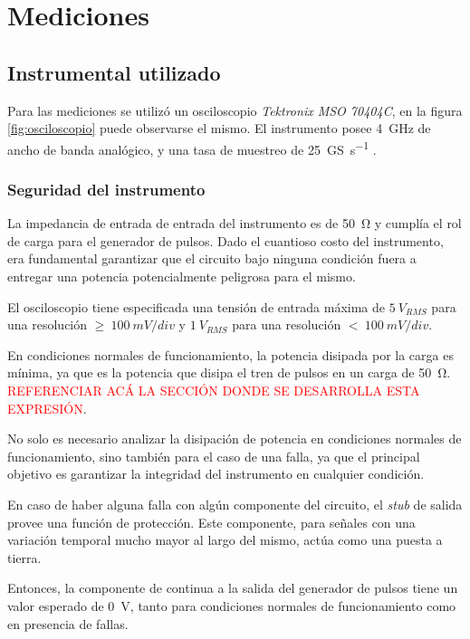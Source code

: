 \section{Mediciones}

\subsection{Instrumental utilizado}

Para las mediciones se utilizó un osciloscopio \textit{Tektronix MSO 70404C},
en la figura \ref{fig:osciloscopio} puede observarse el mismo. El instrumento 
posee \qty{4}{\giga\hertz} de ancho de banda analógico, y una tasa de muestreo
de \qty[per-mode=symbol]{25}{\giga\siemens\per\second} \cite{oscilloscope_datasheet}.

\subsubsection{Seguridad del instrumento}

La impedancia de entrada de entrada del instrumento es de \qty{50}{\ohm} y cumplía 
el rol de carga para el generador de pulsos. Dado el cuantioso costo del
instrumento, era fundamental garantizar que el circuito bajo ninguna condición
fuera a entregar una potencia potencialmente peligrosa para el mismo.

El osciloscopio tiene especificada una tensión de entrada máxima de $5 \ V_{RMS}$
para una resolución $\geq \ 100 \ mV/div$ y $1 \ V_{RMS}$ para una resolución
$< \ 100 \ mV/div$.

En condiciones normales de funcionamiento, la potencia disipada por la carga es
mínima, ya que es la potencia que disipa el tren de pulsos en un carga de
\qty{50}{\ohm}. \textcolor{red}{REFERENCIAR ACÁ LA SECCIÓN DONDE SE DESARROLLA
ESTA EXPRESIÓN}.

No solo es necesario analizar la disipación de potencia en condiciones normales
de funcionamiento, sino también para el caso de una falla, ya que el principal
objetivo es garantizar la integridad del instrumento en cualquier condición.

En caso de haber alguna falla con algún componente del circuito, el \textit{stub}
de salida provee una función de protección. Este componente, para señales con
una variación temporal mucho mayor al largo del mismo, actúa como una puesta a
tierra.

Entonces, la componente de continua a la salida del generador de pulsos tiene un
valor esperado de \qty{0}{\volt}, tanto para condiciones normales de 
funcionamiento como en presencia de fallas.

